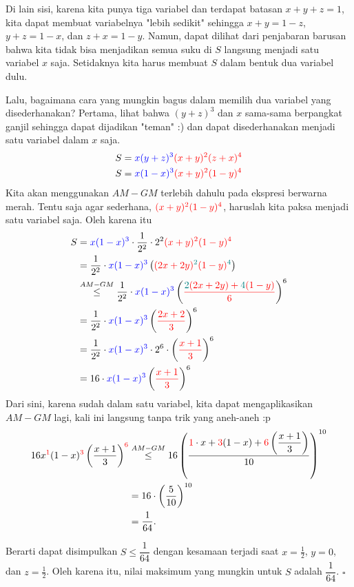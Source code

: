 \documentclass[12pt]{scrartcl}
\begin{document}
Di lain sisi, karena kita punya tiga variabel dan terdapat batasan $x+y+z=1$, kita dapat membuat variabelnya "lebih sedikit" sehingga $x+y=1-z$, $y+z=1-x$, dan $z+x=1-y$. Namun, dapat dilihat dari penjabaran barusan bahwa kita tidak bisa menjadikan semua suku di $S$ langsung menjadi satu variabel $x$ saja. Setidaknya kita harus membuat $S$ dalam bentuk dua variabel dulu.

Lalu, bagaimana cara yang mungkin bagus dalam memilih dua variabel yang disederhanakan? Pertama, lihat bahwa $(y+z)^3$ dan $x$ sama-sama berpangkat ganjil sehingga dapat dijadikan "teman" :) dan dapat disederhanakan menjadi satu variabel dalam $x$ saja.
\begin{align*}
S&={\color{blue}x(y+z)^3}{\color{red}(x+y)^2(z+x)^4}\\
S&={\color{blue}x(1-x)^3}{\color{red}(x+y)^2(1-y)^4}
\end{align*}
Kita akan menggunakan $AM-GM$ terlebih dahulu pada ekspresi berwarna merah. Tentu saja agar sederhana, ${\color{red}(x+y)^2(1-y)^4}$, haruslah kita paksa menjadi satu variabel saja. Oleh karena itu
\allowdisplaybreaks
\begin{align*}
S&= {\color{blue}x(1-x)^3}\cdot\frac{1}{2^2}\cdot{2^2\color{red}(x+y)^2(1-y)^4}\\
&= \frac{1}{2^2}\cdot{\color{blue}x(1-x)^3}\left({\color{red}(2x+2y)^{\color{teal}2}(1-y)^{\color{teal}4}}\right)\\
&\overset{AM-GM}{\le} \frac{1}{2^2}\cdot{\color{blue}x(1-x)^3}\left({\color{red}\dfrac{{\color{teal}2}(2x+2y)+{\color{teal}4}(1-y)}{6}}\right)^6\\
&=\frac{1}{2^2}\cdot{\color{blue}x(1-x)^3}\left({\color{red}\dfrac{2x+2}{3}}\right)^6\\
&=\frac{1}{2^2}\cdot{\color{blue}x(1-x)^3}\cdot2^6\cdot\left({\color{red}\dfrac{x+1}{3}}\right)^6\\
&=16\cdot{\color{blue}x(1-x)^3}\left({\color{red}\dfrac{x+1}{3}}\right)^6
\end{align*}
\newpage
Dari sini, karena sudah dalam satu variabel, kita dapat mengaplikasikan $AM-GM$ lagi, kali ini langsung tanpa trik yang aneh-aneh :p
\begin{align*}
16x^{\color{red}1}(1-x)^{\color{red}3}\left(\dfrac{x+1}{3}\right)^{\color{red}6}
&\overset{AM-GM}{\le} 16\left(\dfrac{{\color{red}1}\cdot x + {\color{red}3}(1-x) + {\color{red}6} \left(\dfrac{x+1}{3}\right)}{10}\right)^{10}\\
&=16\cdot\left(\dfrac{5}{10}\right)^{10}\\
&= \dfrac{1}{64}.
\end{align*}

Berarti dapat disimpulkan $S \le \dfrac{1}{64}$ dengan kesamaan terjadi saat $x=\frac{1}{2}$, $y=0$, dan $z=\frac{1}{2}$. Oleh karena itu, nilai maksimum yang mungkin untuk $S$ adalah $\boxed{\dfrac{1}{64}}$. $\square$
\end{document}
